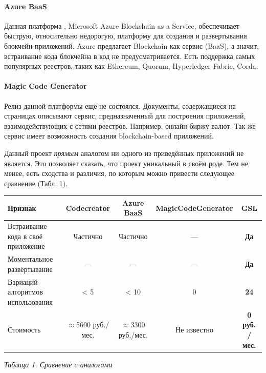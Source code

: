 \paragraph{Azure BaaS}
Данная платформа \cite{MicrosoftAzure}, Microsoft Azure Blockchain as a
Service, обеспечивает быструю, относительно недорогую, платформу для создания и
развертывания блокчейн-приложений. Azure предлагает Blockchain как сервис
(BaaS), а значит, встраивание кода блокчейна в код не предусматривается. Есть
поддержка самых популярных реестров, таких как Ethereum, Quorum, Hyperledger
Fabric, Corda.

\paragraph{Magic Code Generator}
Релиз данной платформы \cite{mcg} ещё не состоялся.  Документы, содержащиеся на
страницах описывают сервис, предназначенный для построения приложений,
взаимодействующих с сетями реестров. Например, онлайн биржу валют. Так же
сервис имеет возможность создания blockchain-based приложений.


Данный проект \emph{прямым} аналогом ни одного из приведённых приложений не
является. Это позволяет сказать, что проект уникальный в своём роде. Тем не
менее, есть сходства и различия, по которым можно привести следующее сравнение
(Табл. 1).

\begin{center}
    \begin{tabular}{ | p{4cm} | c | c | c | c | }
    \hline
    \hline
      Признак & Codecreator & Azure BaaS & MagicCodeGenerator\footnotemark & \textbf{GSL} \\ \hline
      Встраивание кода в своё приложение & Частично & Частично & --- & \textbf{Да} \\ \hline
      Моментальное развёртывание & --- & --- & --- & \textbf{Да} \\ \hline
      Вариаций алгоритмов использования & < 5 & < 10 & 0 & \textbf{24} \\ \hline
      Стоимость & $\approx$5600 руб./мес. & $\approx$3300 руб./мес. & Не известно & \textbf{0 руб. / мес.} \\ \hline
    \hline
  \end{tabular}

    \vspace{-5cm} \hfill \emph{Таблица 1. Сравнение с аналогами} \vspace{5cm}
\end{center}

